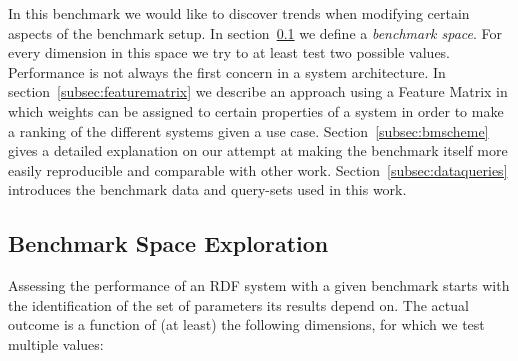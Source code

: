 In this benchmark we would like to discover trends when modifying certain aspects of the benchmark setup. In section~\ref{subsec:bmexplore} we define a \emph{benchmark space}. For every dimension in this space we try to at least test two possible values.
Performance is not always the first concern in a system architecture. In section~\ref{subsec:featurematrix} we describe an approach using a Feature Matrix in which weights can be assigned to certain properties of a system in order to make a ranking of the different systems given a use case. Section~\ref{subsec:bmscheme} gives a detailed explanation on our attempt at making the benchmark itself more easily reproducible and comparable with other work. Section~\ref{subsec:dataqueries} introduces the benchmark data and query-sets used in this work. 

\subsection{Benchmark Space Exploration}
\label{subsec:bmexplore}
Assessing the performance of an RDF system with a given benchmark starts with the identification of the set of parameters its results depend on. 
The actual outcome is a function of (at least) the following dimensions, for which we test multiple values:

